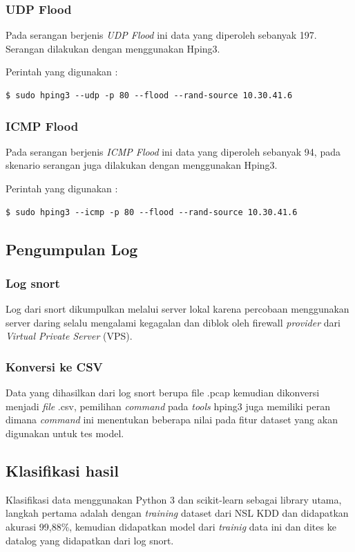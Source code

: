 \subsubsection{UDP Flood}
Pada serangan berjenis \textit{UDP Flood} ini data yang diperoleh sebanyak 197. Serangan dilakukan dengan menggunakan Hping3. \newline

Perintah yang digunakan :

\begin{lstlisting}
$ sudo hping3 --udp -p 80 --flood --rand-source 10.30.41.6
\end{lstlisting}


\subsubsection{ICMP Flood}
Pada serangan berjenis \textit{ICMP Flood} ini data yang diperoleh sebanyak 94, pada skenario serangan juga dilakukan dengan menggunakan Hping3.

Perintah yang digunakan :
\begin{lstlisting}
$ sudo hping3 --icmp -p 80 --flood --rand-source 10.30.41.6
\end{lstlisting}

\subsection{Pengumpulan Log}
\subsubsection{Log snort}
Log dari snort dikumpulkan melalui server lokal karena percobaan menggunakan server daring selalu mengalami kegagalan dan diblok oleh firewall \textit{provider} dari \textit{Virtual Private Server} (VPS).

\subsubsection{Konversi ke CSV}
Data yang dihasilkan dari log snort berupa file .pcap kemudian dikonversi menjadi \textit{file} .csv, pemilihan \textit{command} pada \textit{tools} hping3 juga memiliki peran dimana \textit{command} ini menentukan beberapa nilai pada fitur dataset yang akan digunakan untuk tes model.

\subsection{Klasifikasi hasil}
Klasifikasi data menggunakan Python 3 dan scikit-learn sebagai library utama, langkah pertama adalah dengan \textit{training} dataset dari NSL KDD dan didapatkan akurasi 99,88\%, kemudian didapatkan model dari \textit{trainig} data ini dan dites ke datalog yang didapatkan dari log snort.

